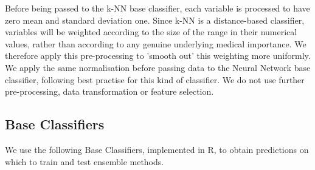 \documentclass{document}
\begin{document}
Before being passed to the k-NN base classifier, each variable is processed to have zero mean and standard deviation one. Since k-NN is a distance-based classifier, variables will be weighted according to the size of the range in their numerical values, rather than according to any genuine underlying medical importance. We therefore apply this pre-processing to 'smooth out' this weighting more uniformly. We apply the same normalisation before passing data to the Neural Network base classifier, following best practise for this kind of classifier. We do not use further pre-processing, data transformation or feature selection.


\subsection{Base Classifiers}

We use the following Base Classifiers, implemented in R, to obtain predictions on which to train and test ensemble methods.
\end{document}
